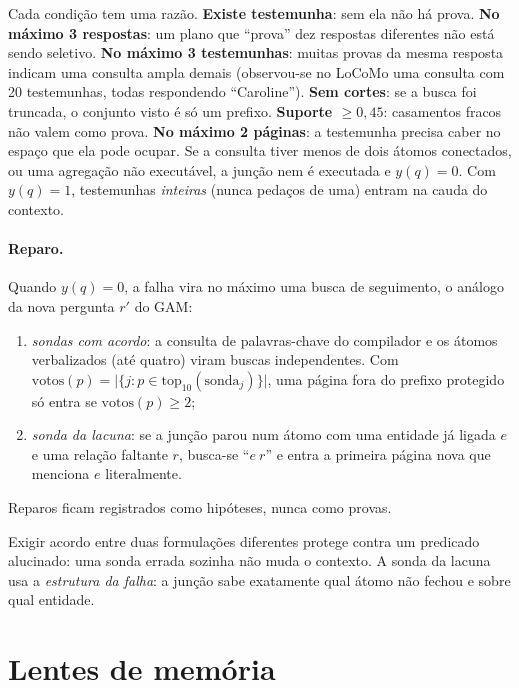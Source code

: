\documentclass[11pt]{article}
\begin{document}
\begin{empalavras}
Cada condição tem uma razão. \textbf{Existe testemunha}: sem ela não há prova.
\textbf{No máximo 3 respostas}: um plano que ``prova'' dez respostas
diferentes não está sendo seletivo. \textbf{No máximo 3 testemunhas}: muitas
provas da mesma resposta indicam uma consulta ampla demais (observou-se no
LoCoMo uma consulta com 20 testemunhas, todas respondendo ``Caroline'').
\textbf{Sem cortes}: se a busca foi truncada, o conjunto visto é só um
prefixo. \textbf{Suporte $\ge0{,}45$}: casamentos fracos não valem como prova.
\textbf{No máximo 2 páginas}: a testemunha precisa caber no espaço que ela pode
ocupar. Se a consulta tiver menos de dois átomos conectados, ou uma agregação
não executável, a junção nem é executada e $y(q)=0$. Com $y(q)=1$, testemunhas
\emph{inteiras} (nunca pedaços de uma) entram na cauda do contexto.
\end{empalavras}

\paragraph{Reparo.}
Quando $y(q)=0$, a falha vira no máximo uma busca de seguimento, o análogo da
nova pergunta $r'$ do GAM:
\begin{enumerate}[label=(\roman*), nosep]
\item \emph{sondas com acordo}: a consulta de palavras-chave do compilador e
os átomos verbalizados (até quatro) viram buscas independentes. Com
$\mathrm{votos}(p)=\bigl|\{j:p\in\mathrm{top}_{10}(\text{sonda}_j)\}\bigr|$,
uma página fora do prefixo protegido só entra se $\mathrm{votos}(p)\ge2$;
\item \emph{sonda da lacuna}: se a junção parou num átomo com uma entidade já
ligada $e$ e uma relação faltante $r$, busca-se ``$e\ r$'' e entra a primeira
página nova que menciona $e$ literalmente.
\end{enumerate}
Reparos ficam registrados como hipóteses, nunca como provas.

\begin{empalavras}
Exigir acordo entre duas formulações diferentes protege contra um predicado
alucinado: uma sonda errada sozinha não muda o contexto. A sonda da lacuna
usa a \emph{estrutura da falha}: a junção sabe exatamente qual átomo não
fechou e sobre qual entidade.
\end{empalavras}

\section{Lentes de memória}\label{sec:lentes}
\end{document}
